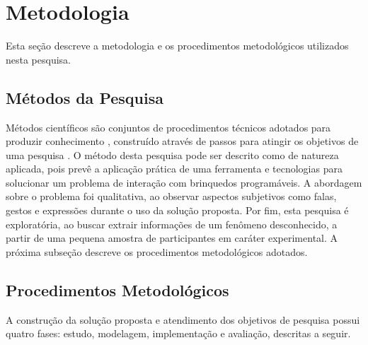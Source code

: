 \section{Metodologia}
\label{s_cintro_metodologia}

Esta seção descreve a metodologia e os procedimentos metodológicos utilizados nesta pesquisa.

\subsection{Métodos da Pesquisa}
\label{ss_cintro_metod_pesquisa}

Métodos científicos são conjuntos de procedimentos técnicos adotados para produzir conhecimento \cite{gil_metodos_2008}, construído através de passos para atingir os objetivos de uma pesquisa \cite{wazlawick_metodologia_2009}. O método desta pesquisa pode ser descrito como de natureza aplicada, pois prevê a aplicação prática de uma ferramenta e tecnologias para solucionar um problema de interação com brinquedos programáveis. A abordagem sobre o problema foi qualitativa, ao observar aspectos subjetivos como falas, gestos e expressões durante o uso da solução proposta. Por fim, esta pesquisa é exploratória, ao buscar extrair informações de um fenômeno desconhecido, a partir de uma pequena amostra de participantes em caráter experimental. A próxima subseção descreve os procedimentos metodológicos adotados.

\subsection{Procedimentos Metodológicos}
\label{ss_cintro_proced_metodologicos}

A construção da solução proposta e atendimento dos objetivos de pesquisa possui quatro fases: estudo, modelagem, implementação e avaliação, descritas a seguir.

